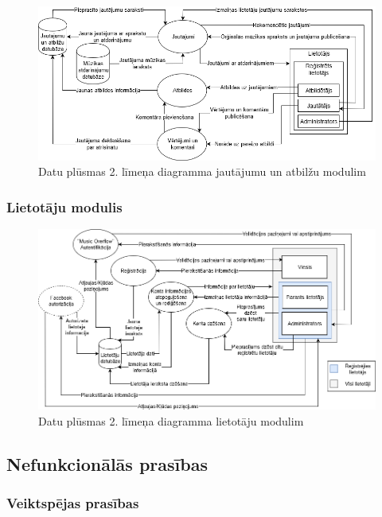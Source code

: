 \documentclass[12pt]{article}
\begin{document}
\begin{figure}[H]
\begin{center}
	\includegraphics[scale=0.5]{DPD2_2.png}
	\caption{Datu plūsmas 2. līmeņa diagramma jautājumu un atbilžu modulim}
	\label{fig:dpd_2_2}
\end{center}
\end{figure}

\subsubsection{Lietotāju modulis}

\begin{figure}[H]
\begin{center}
	\includegraphics[scale=0.5]{DPD2_3.png}
	\caption{Datu plūsmas 2. līmeņa diagramma lietotāju modulim}
	\label{fig:dpd_2_3}
\end{center}
\end{figure}

\subsection{Nefunkcionālās prasības}

\subsubsection{Veiktspējas prasības}
\end{document}
